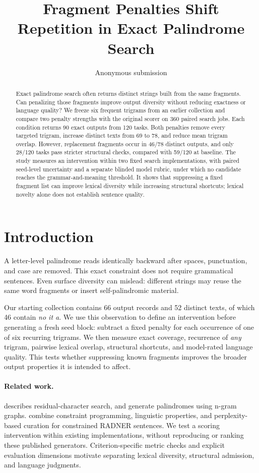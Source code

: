 \documentclass[11pt]{article}
\title{Fragment Penalties Shift Repetition in Exact Palindrome Search}
\author{Anonymous submission}
\begin{document}
\maketitle

\begin{abstract}
Exact palindrome search often returns distinct strings built from the same fragments. Can penalizing those fragments improve output diversity without reducing exactness or language quality? We freeze six frequent trigrams from an earlier collection and compare two penalty strengths with the original scorer on 360 paired search jobs. Each condition returns 90 exact outputs from 120 tasks. Both penalties remove every targeted trigram, increase distinct texts from 69 to 78, and reduce mean trigram overlap. However, replacement fragments occur in 46/78 distinct outputs, and only 28/120 tasks pass stricter structural checks, compared with 59/120 at baseline. The study measures an intervention within two fixed search implementations, with paired seed-level uncertainty and a separate blinded model rubric, under which no candidate reaches the grammar-and-meaning threshold. It shows that suppressing a fixed fragment list can improve lexical diversity while increasing structural shortcuts; lexical novelty alone does not establish sentence quality.
\end{abstract}

\section{Introduction}
A letter-level palindrome reads identically backward after spaces, punctuation, and case are removed. This exact constraint does not require grammatical sentences. Even surface diversity can mislead: different strings may reuse the same word fragments or insert self-palindromic material.

Our starting collection contains 66 output records and 52 distinct texts, of which 46 contain \emph{no it a}. We use this observation to define an intervention before generating a fresh seed block: subtract a fixed penalty for each occurrence of one of six recurring trigrams. We then measure exact coverage, recurrence of \emph{any} trigram, pairwise lexical overlap, structural shortcuts, and model-rated language quality. This tests whether suppressing known fragments improves the broader output properties it is intended to affect.

\paragraph{Related work.}
\citet{norvig2002palindrome} describes residual-character search, and \citet{papadopoulos2015palindromes} generate palindromes using n-gram graphs. \citet{bonlarron-regin-2024} combine constraint programming, linguistic properties, and perplexity-based curation for constrained RADNER sentences. We test a scoring intervention within existing implementations, without reproducing or ranking these published generators. Criterion-specific metric checks \citep{sai-etal-2021-perturbation} and explicit evaluation dimensions \citep{howcroft-etal-2020-twenty} motivate separating lexical diversity, structural admission, and language judgments.
\end{document}
